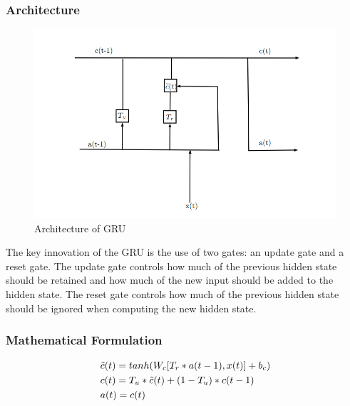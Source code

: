 \documentclass{article}
\begin{document}
\subsubsection{Architecture}
\vspace{1em}
\begin{figure}[h]
	\centering
	\includegraphics[scale=0.7]{images/gru}
	\caption{Architecture of GRU}
\end{figure}

\newpage
The key innovation of the GRU is the use of two gates: an update gate and a reset gate. The update gate controls how much of the previous hidden state should be retained and how much of the new input should be added to the hidden state. The reset gate controls how much of the previous hidden state should be ignored when computing the new hidden state.

\vspace{1em}
\subsubsection{Mathematical Formulation}
\vspace{1em}

\begin{center}
\begin{tcolorbox}[colframe=orange,boxsep=5pt,boxrule=1pt,colback=white, width=0.6\linewidth]
\begin{equation*}
	\begin{aligned}
		\centering
		& \tilde{c}(t) = tanh( W_c [T_r * a(t-1), x(t)] + b_c)	\\
		& c(t) =  T_u * \tilde{c}(t) + (1 - T_u) * c(t-1) \\
		& a(t) =  c(t) \\
	\end{aligned}
\end{equation*}
\end{tcolorbox}
\end{center}
\end{document}
